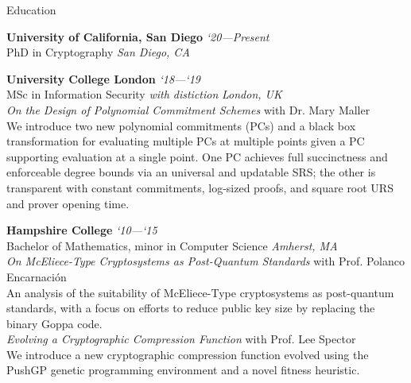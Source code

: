 \documentclass{cv}
\begin{document}
\begin{rSection}{Education}

\textbf{University of California, San Diego} \hfill \emph{`20---Present}  \\
PhD in Cryptography \hfill \emph{San Diego, CA}

\textbf{University College London} \hfill \emph{`18---`19}  \\
MSc in Information Security \emph{with distiction} \hfill \emph{London, UK} \\
\emph{On the Design of Polynomial Commitment Schemes} with Dr. Mary Maller \\
{\small We introduce two new polynomial commitments (PCs) and a black box transformation for evaluating multiple PCs at multiple points given a PC supporting evaluation at a single point. One PC achieves full succinctness and enforceable degree bounds via an universal and updatable SRS; the other is transparent with constant commitments, log-sized proofs, and square root URS and prover opening time.}

\textbf{Hampshire College} \hfill \emph{`10---`15} \\
Bachelor of Mathematics, minor in Computer Science \hfill \emph{Amherst, MA} \\
\emph{On McEliece-Type Cryptosystems as Post-Quantum Standards} with Prof. Polanco Encarnación \\
{\small An analysis of the suitability of McEliece-Type cryptosystems as post-quantum standards, with a focus on efforts to reduce public key size by replacing the binary Goppa code.} \\
\emph{Evolving a Cryptographic Compression Function} with Prof. Lee Spector \\
{\small We introduce a new cryptographic compression function evolved using the PushGP genetic programming environment and a novel fitness heuristic.}

\end{rSection}
\end{document}
